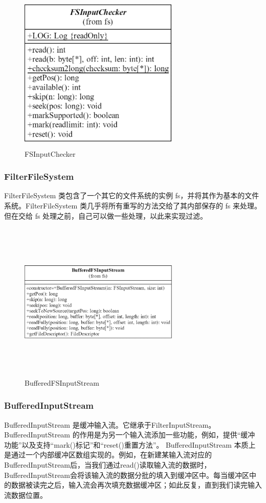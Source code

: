 	\begin{figure}
		\centering
		\includegraphics[width=3in,height=3in]{UML/inputstream/FSInputChecker.png}
		\caption{FSInputChecker}
		\label{fig:graph7}
	\end{figure}
	\subsubsection{FilterFileSystem} 
	FilterFileSystem 类包含了一个其它的文件系统的实例 fs，并将其作为基本的文件系统。FilterFileSystem 类几乎将所有重写的方法交给了其内部保存的 fs 来处理。但在交给 fs 处理之前，自己可以做一些处理，以此来实现过滤。
	\begin{figure}
		\centering
		\includegraphics[width=3in,height=3in]{UML/inputstream/BufferedFSInputStream.png}
		\caption{BufferedFSInputStream}
		\label{fig:graph8}
	\end{figure}
	
	\subsubsection{BufferedInputStream} 
	BufferedInputStream 是缓冲输入流。它继承于FilterInputStream。
	BufferedInputStream 的作用是为另一个输入流添加一些功能，例如，提供“缓冲功能”以及支持“mark()标记”和“reset()重置方法”。
	BufferedInputStream 本质上是通过一个内部缓冲区数组实现的。例如，在新建某输入流对应的BufferedInputStream后，当我们通过read()读取输入流的数据时，BufferedInputStream会将该输入流的数据分批的填入到缓冲区中。每当缓冲区中的数据被读完之后，输入流会再次填充数据缓冲区；如此反复，直到我们读完输入流数据位置。
	
	\endinput